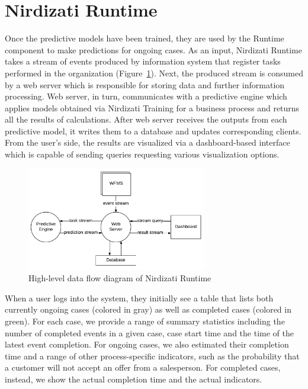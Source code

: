 \documentclass[runningheads,a4paper]{llncs}
\begin{document}
\section{Nirdizati Runtime} \label{sec:runtime}
Once the predictive models have been trained, they are used by the Runtime component to make predictions for ongoing cases. As an input, Nirdizati Runtime takes a stream of events produced by information system that register tasks performed in the organization (Figure~\ref{fig:dfd_0}). Next, the produced stream is consumed by a web server which is responsible for storing data and further information processing.
Web server, in turn, communicates with a predictive engine which applies models obtained via Nirdizati Training for a business process and returns all the results of calculations.
After web server receives the outputs from each predictive model, it writes them to a database and updates corresponding clients.
From the user's side, the results are visualized via a dashboard-based interface which is capable of sending queries requesting various visualization options.

\begin{figure}
	\centering
	\includegraphics[width=0.7\textwidth]{img/dfd_0}
	\caption{High-level data flow diagram of Nirdizati Runtime}
	\label{fig:dfd_0}
\end{figure}
\vspace{-\baselineskip}

When a user logs into the system, they initially see a table that lists both currently ongoing cases (colored in gray) as well as completed cases (colored in green). For each case, we provide a range of summary statistics including the number of completed events in a given case, case start time and the time of the latest event completion. For ongoing cases, we also estimated their completion time and a range of other process-specific indicators, such as the probability that a customer will not accept an offer from a salesperson. For completed cases, instead, we show the actual completion time and the actual indicators.
\end{document}
